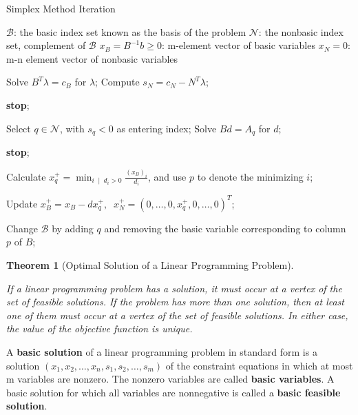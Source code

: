 \documentclass[unicode,11pt,a4paper,oneside,numbers=endperiod,openany, draft]{scrartcl}
\newtheorem{theorem}{Theorem}[section]
\newcommand{\myth}[3]{
    \begin{theorem}[#1] 
        \label{#2} 
        #3 
    \end{theorem}
}
\begin{document}
\begin{algorithm}
\caption{Simplex Method Iteration}\label{alg:ex3-simplex-iter}
  \begin{algorithmic}[1]
    \Require \( \mathcal{B}\): the basic index set known as the basis of the problem
    \Require \( \mathcal{N} \): the nonbasic index set, complement of \( \mathcal{B} \)
    \Require \( x_B = B^{-1} b \geq 0 \): m-element vector of basic variables
    \Require \( x_N = 0 \): m-n element vector of nonbasic variables

    \State Solve \( B^T \lambda = c_B \) for \( \lambda \);
    \State Compute \( s_N = c_N - N^T \lambda \); 
    \State

        \State \textbf{stop};  
    \EndIf
    \State

    \State Select \( q \in \mathcal{N} \), with \( s_q < 0 \) as entering index;
    \State Solve \( Bd = A_q \) for \( d \);
    \State

        \State \textbf{stop};  
    \EndIf
    \State

    \State Calculate \( x_q^+ = \min_{i \; \mid \; d_i > 0} \frac{(x_B)_i}{d_i} \),
    and use \( p \) to denote the minimizing \( i \);

    \State Update \( x_B^+ = x_B - dx_q^+, \;\; x_N^+ = (0, \ldots, 0, x_q^+, 0, \ldots, 0)^T \);

    \State Change \( \mathcal{B} \) by adding \( q \) and removing the basic variable 
    corresponding to column \( p \) of \( B \);

  \end{algorithmic}
\end{algorithm}

\myth{Optimal Solution of a Linear Programming Problem}{th:linear-programming-solution}{
    If a linear programming problem has a solution,
    it must occur at a vertex of the set of feasible solutions.
    If the problem has more than one solution,
    then at least one of them must occur at a vertex of the set of feasible solutions.
    In either case, the value of the objective function is unique.
}

A \textbf{basic solution} of a linear programming problem in standard form is a solution
\( ( x_1, x_2, \ldots, x_n, s_1, s_2, \ldots, s_m ) \)
of the constraint equations in which at most m variables are nonzero.
The nonzero variables are called \textbf{basic variables}.
A basic solution for which all variables are nonnegative
is called a \textbf{basic feasible solution}.
\end{document}
